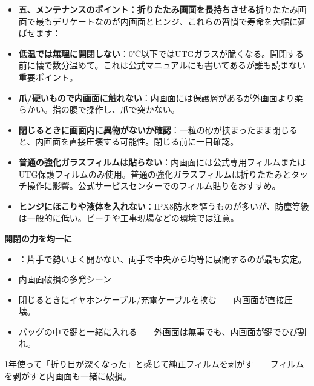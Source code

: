 \begin{itemize}
  \item \textbf{五、メンテナンスのポイント：折りたたみ画面を長持ちさせる}折りたたみ画面で最もデリケートなのが内画面とヒンジ、これらの習慣で寿命を大幅に延ばせます：
  \item \textbf{低温では無理に開閉しない}：0℃以下ではUTGガラスが脆くなる。開閉する前に懐で数分温めて。これは公式マニュアルにも書いてあるが誰も読まない重要ポイント。
  \item \textbf{爪/硬いもので内画面に触れない}：内画面には保護層があるが外画面より柔らかい。指の腹で操作し、爪で突かない。
  \item \textbf{閉じるときに画面内に異物がないか確認}：一粒の砂が挟まったまま閉じると、内画面を直接圧壊する可能性。閉じる前に一目確認。
  \item \textbf{普通の強化ガラスフィルムは貼らない}：内画面には公式専用フィルムまたはUTG保護フィルムのみ使用。普通の強化ガラスフィルムは折りたたみとタッチ操作に影響。公式サービスセンターでのフィルム貼りをおすすめ。
  \item \textbf{ヒンジにほこりや液体を入れない}：IPX8防水を謳うものが多いが、防塵等級は一般的に低い。ビーチや工事現場などの環境では注意。
\end{itemize}

\textbf{開閉の力を均一に}\par

\begin{itemize}
  \item ：片手で勢いよく開かない、両手で中央から均等に展開するのが最も安定。
  \item 内画面破損の多発シーン
  \item 閉じるときにイヤホンケーブル/充電ケーブルを挟む——内画面が直接圧壊。
  \item バッグの中で鍵と一緒に入れる——外画面は無事でも、内画面が鍵でひび割れ。
\end{itemize}


1年使って「折り目が深くなった」と感じて純正フィルムを剥がす——フィルムを剥がすと内画面も一緒に破損。


